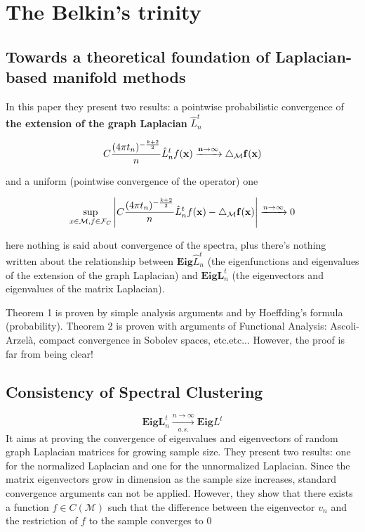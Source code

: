 \section{The Belkin's trinity}
\subsection{Towards a theoretical foundation of Laplacian-based manifold methods}

In this paper they present two results: a pointwise probabilistic convergence of \textbf{the extension of the graph Laplacian} $\hat L_n^t$ 

$$C\frac{(4\pi t_n)^{-\frac{k+2}{2}}}{n}\hat L_n^t f(\bf x) \xrightarrow{n\to\infty}\triangle_\mathcal M f(\bf x)$$

and a uniform (pointwise convergence of the operator) one

$$\sup_{x\in\mathcal M, f\in \mathcal F_C}\left| C\frac{(4\pi t_n)^{-\frac{k+2}{2}}}{n}\hat L_n^t f(\bf x) - \triangle_\mathcal M f(\bf x) \right|\xrightarrow{n\to\infty}0$$

here nothing is said about convergence of the spectra, plus there's nothing written about the relationship between $\mathbf{Eig}\hat L_n^t$ (the eigenfunctions and eigenvalues of the extension of the graph Laplacian) and $\mathbf {Eig} \mathbf {L}_n^t$ (the eigenvectors and eigenvalues of the matrix Laplacian).

Theorem 1 is proven by simple analysis arguments and by Hoeffding's formula (probability). Theorem 2 is proven with arguments of Functional Analysis: Ascoli-Arzelà, compact convergence in Sobolev spaces, etc.etc... However, the proof is far from being clear! 

\subsection{Consistency of Spectral Clustering}
 $$ \mathbf{Eig} \mathbf{L}^t_n \xrightarrow[a.s.]{n\to\infty} \mathbf{Eig} L^t $$
It aims at proving the convergence of eigenvalues and eigenvectors of random graph Laplacian matrices for growing sample size. They present two results: one for the normalized Laplacian and one for the unnormalized Laplacian. Since the matrix eigenvectors grow in dimension as the sample size increases, standard convergence arguments can not be applied. However, they show that there exists a function $f\in C(\mathcal M)$ such that the difference between the eigenvector $v_n$ and the restriction of $f$ to the sample converges to $0$

